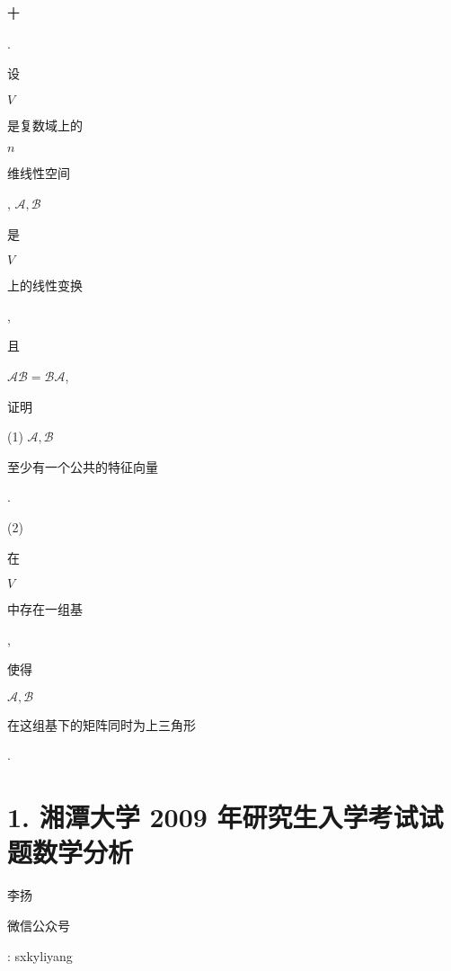 \documentclass[10pt]{article}
\begin{document}
\begin{CJK}{UTF8}{mj}十\end{CJK}. \begin{CJK}{UTF8}{mj}设\end{CJK} $V$ \begin{CJK}{UTF8}{mj}是复数域上的\end{CJK} $n$ \begin{CJK}{UTF8}{mj}维线性空间\end{CJK}, $\mathscr{A}, \mathscr{B}$ \begin{CJK}{UTF8}{mj}是\end{CJK} $V$ \begin{CJK}{UTF8}{mj}上的线性变换\end{CJK}, \begin{CJK}{UTF8}{mj}且\end{CJK} $\mathscr{A} \mathscr{B}=\mathscr{B} \mathscr{A}$, \begin{CJK}{UTF8}{mj}证明\end{CJK}

(1) $\mathscr{A}, \mathscr{B}$ \begin{CJK}{UTF8}{mj}至少有一个公共的特征向量\end{CJK}.

(2) \begin{CJK}{UTF8}{mj}在\end{CJK} $V$ \begin{CJK}{UTF8}{mj}中存在一组基\end{CJK}, \begin{CJK}{UTF8}{mj}使得\end{CJK} $\mathscr{A}, \mathscr{B}$ \begin{CJK}{UTF8}{mj}在这组基下的矩阵同时为上三角形\end{CJK}.

\section{1. 湘潭大学 2009 年研究生入学考试试题数学分析}
\begin{CJK}{UTF8}{mj}李扬\end{CJK}

\begin{CJK}{UTF8}{mj}微信公众号\end{CJK}: sxkyliyang
\end{document}
